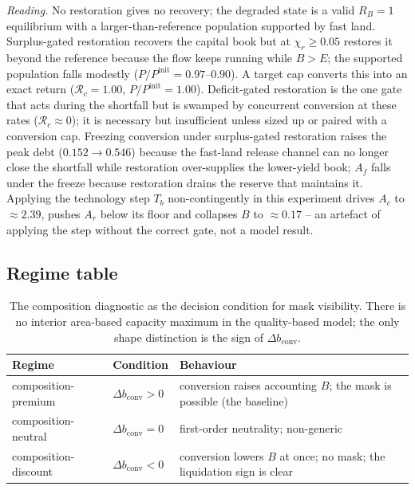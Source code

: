 \documentclass[11pt,a4paper]{article}
\newcommand{\dconv}{\Delta b_{\mathrm{conv}}}
\begin{document}
\noindent\emph{Reading.} No restoration gives no recovery; the degraded state is a valid $R_B=1$ equilibrium with a larger-than-reference population supported by fast land. Surplus-gated restoration recovers the capital book but at $\chi_r\ge0.05$ restores it beyond the reference because the flow keeps running while $B>E$; the supported population falls modestly ($P/P^{\mathrm{init}}=0.97$--$0.90$). A target cap converts this into an exact return ($\mathcal R_c=1.00$, $P/P^{\mathrm{init}}=1.00$). Deficit-gated restoration is the one gate that acts during the shortfall but is swamped by concurrent conversion at these rates ($\mathcal R_c\approx0$); it is necessary but insufficient unless sized up or paired with a conversion cap. Freezing conversion under surplus-gated restoration raises the peak debt ($0.152\to0.546$) because the fast-land release channel can no longer close the shortfall while restoration over-supplies the lower-yield book; $A_f$ falls under the freeze because restoration drains the reserve that maintains it. Applying the technology step $T_b$ non-contingently in this experiment drives $A_c$ to $\approx2.39$, pushes $A_r$ below its floor and collapses $B$ to $\approx0.17$ -- an artefact of applying the step without the correct gate, not a model result.

\subsection{Regime table}\label{si:regimes}

\begin{table}[H]
\centering\small
\caption{The composition diagnostic as the decision condition for mask visibility. There is no interior area-based capacity maximum in the quality-based model; the only shape distinction is the sign of $\dconv$.}
\label{tab:si_regime}
\begin{tabularx}{\textwidth}{l l X}
\toprule
Regime & Condition & Behaviour \\
\midrule
composition-premium & $\dconv>0$ & conversion raises accounting $B$; the mask is possible (the baseline) \\
composition-neutral & $\dconv=0$ & first-order neutrality; non-generic \\
composition-discount & $\dconv<0$ & conversion lowers $B$ at once; no mask; the liquidation sign is clear \\
\bottomrule
\end{tabularx}
\end{table}
\end{document}
